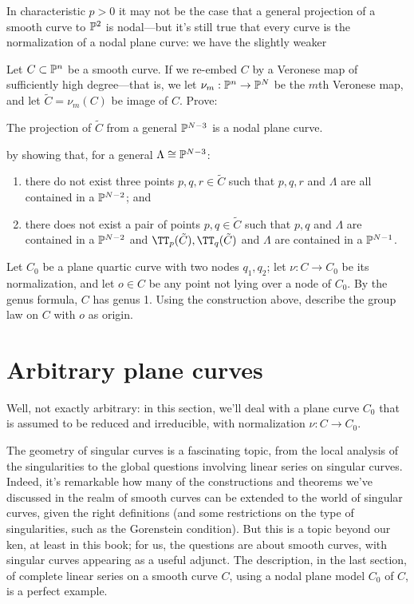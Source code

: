 In characteristic $p > 0$ it may not be the case that a general projection of a smooth curve to $\PP^2$ is nodal---but it's still true that every curve is the normalization of a nodal plane curve: we have the slightly weaker

\begin{exercise}
Let $C\subset \PP^n$ be a smooth curve. If we re-embed $C$ by a Veronese map of sufficiently high degree---that is, we let $\nu_m : \PP^n \to \PP^N$ be the $m$th Veronese map, and let $\tilde C = \nu_m(C)$ be image of $C$. Prove:

\begin{proposition}\label{positive characteristic nodes}
The projection of $\tilde C$ from a general $\PP^{N-3}$ is a nodal plane curve.
\end{proposition}

by showing that, for a general $\Lambda \cong \PP^{N-3}$:
\begin{enumerate}
\item there do not exist three points $p,q,r \in \tilde C$ such that $p, q, r$ and $\Lambda$ are all contained in a $\PP^{N-2}$; and
\item there does not exist a pair of points $p, q \in \tilde C$ such that 
$p, q$ and $\Lambda$ are contained in a $\PP^{N-2}$ and $\TT_p(\tilde C), \TT_q(\tilde C)$ and $\Lambda$ are contained in a $\PP^{N-1}$.
\end{enumerate}
\end{exercise}

\begin{exercise}
Let $C_0$ be a plane quartic curve with two nodes $q_1, q_2$; let $\nu : C \to C_0$ be its normalization, and let $o \in C$ be any point not lying over a node of $C_0$.
By the genus formula, $C$ has genus 1. Using the construction above, describe the group law on $C$ with $o$ as origin.
\end{exercise}

\section{Arbitrary plane curves}\label{arbitrary plane curves}

Well, not exactly arbitrary: in this section, we'll deal with a plane curve $C_0$ that is assumed to be reduced and irreducible, with normalization $\nu : C \to C_0$. 

The geometry of singular curves is a fascinating topic, from the local analysis of the singularities to the global questions involving linear series on singular curves. Indeed, it's remarkable how many of the constructions and theorems we've discussed in the realm of smooth curves can be extended to the world of singular curves, given the right definitions (and some restrictions on the type of singularities, such as the Gorenstein condition). But this is a topic beyond our ken, at least in this book; for us, the questions are about smooth curves, with singular curves appearing as a useful adjunct. The description, in the last section, of complete linear series on a smooth curve $C$, using a nodal plane model $C_0$ of $C$, is a perfect example.


